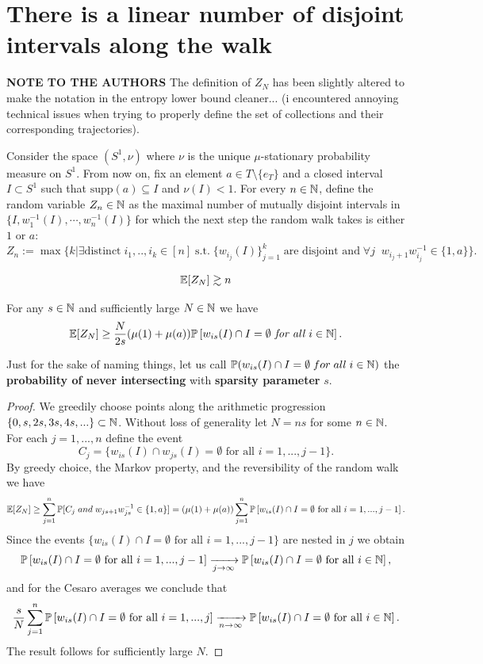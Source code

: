 \section{There is a linear number of disjoint intervals along the walk}
\textbf{NOTE TO THE AUTHORS} The definition of $Z_N$ has been slightly altered to make the notation in the entropy lower bound cleaner... (i encountered annoying technical issues when trying to properly define the set of collections and their corresponding trajectories).

Consider the space $(S^1, \nu)$ where $\nu$ is the unique $\mu$-stationary probability measure on $S^1$.
From now on, fix an element $a \in T \setminus \{e_T\}$ and a closed interval $I \subset S^1$ such that $\mathrm{supp}(a) \subseteq I$ and $\nu(I) < 1$.
For every $n \in {\mathbb N}$, define the random variable $Z_n \in {\mathbb N}$ 
as the maximal number of mutually disjoint intervals in $\{I, w_1^{-1}(I), \cdots, w_n^{-1}(I)\}$ for which the next step the random walk takes is either $1$ or $a$:
$$Z_n := \max\{k | \exists \text{distinct}\; i_1,..,i_k \in [n] \;\text{s.t.}\; \{w_{i_j}(I)\}_{j=1}^k\; \text{are disjoint and}\; \forall j\;\;w_{i_j+1}w_{i_j}^{-1} \in \{1,a\}\}.$$

\begin{proposition}
    $${\mathbb E}[Z_N] \gtrsim n$$
\end{proposition}

\begin{lemma}
For any $s \in {\mathbb N}$ and sufficiently large $N \in {\mathbb N}$ we have
\[{\mathbb E}[Z_N] \ge \dfrac{N}{2s} (\mu(1)+\mu(a)) {\mathbb P}\left[ w_{is}(I) \cap I = \emptyset \emph{ for all } i \in {\mathbb N} \right]. \]
\end{lemma}

Just for the sake of naming things, let us call ${\mathbb P}(w_{is}(I) \cap I = \emptyset \;for\;all\;i \in {\mathbb N})$ the \textbf{probability of never intersecting} with \textbf{sparsity parameter} $s$.

\begin{proof}
We greedily choose points along the arithmetic progression $\{0,s,2s,3s,4s,...\} \subset {\mathbb N}$.
Without loss of generality let $N = ns$ for some $n \in {\mathbb N}$.
For each $j=1,...,n$ define the event 
\[C_j = \{w_{is}(I)\cap w_{js}(I) = \emptyset  \text{ for all }i=1,...,j-1\}.\]
By greedy choice, the Markov property, and the reversibility of the random walk we have
\[{\mathbb E}[Z_N] \geq \sum_{j=1}^n {\mathbb P}[C_j\;and\;w_{js+1}w_{js}^{-1} \in \{1,a\}] = (\mu(1)+\mu(a)) \sum_{j=1}^n {\mathbb P}\left[ w_{is}(I) \cap I = \emptyset \text{ for all }i=1,...,j-1\right]. \]
Since the events $\{w_{is}(I) \cap I = \emptyset \text{ for all }i=1,...,j-1\}$ are nested in $j$ we obtain 
\[ {\mathbb P}\left[ w_{is}(I) \cap I = \emptyset \text{ for all }i=1,...,j-1\right]  \xrightarrow[j \to \infty]{} {\mathbb P}\left[ w_{is}(I) \cap I = \emptyset \text{ for all }i \in {\mathbb N}\right],\]
and for the Cesaro averages we conclude that 
\[\dfrac{s}{N} \sum_{j=1}^n {\mathbb P}\left[ w_{is}(I) \cap I = \emptyset \text{ for all }i=1,...,j\right] \xrightarrow[n \to \infty]{} {\mathbb P}\left[ w_{is}(I) \cap I = \emptyset \text{ for all }i \in {\mathbb N}\right]. \]
The result follows for sufficiently large $N$.
\end{proof}

